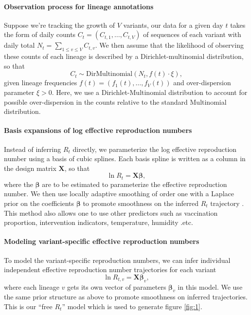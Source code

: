 \documentclass[11pt,oneside,letterpaper]{article}
\renewcommand{\vec}[1]{\boldsymbol{#1}}
\begin{document}
\paragraph{Observation process for lineage annotations}%

Suppose we're tracking the growth of $V$ variants, our data for a given day $t$ takes the form of daily counts $C_{t} = (C_{t,1}, \ldots, C_{t,V})$ of sequences of each variant with daily total $N_{t} = \sum_{1\leq v \leq V} C_{t, v}$.
We then assume that the likelihood of observing these counts of each lineage is described by a Dirichlet-multinomial distribution, so that
\begin{equation}
    C_{t} \sim \text{DirMultinomial}(N_{t}, f(t)\cdot \xi),
\end{equation}
given lineage frequencies $f(t) = (f_{1}(t), \ldots, f_{V}(t))$ and over-dispersion parameter $\xi>0$.
Here, we use a Dirichlet-Multinomial distribution to account for possible over-dispersion in the counts relative to the standard Multinomial distribution.

\paragraph{Basis expansions of log effective reproduction numbers}%

Instead of inferring $R_{t}$ directly, we parameterize the log effective reproduction number using a basis of cubic splines.
Each basis spline is written as a column in the design matrix $\vec{X}$, so that
\begin{equation}
  \ln R_{t} = \vec{X} \vec{\beta},
\end{equation}
where the $\vec{\beta}$ are to be estimated to parameterize the effective reproduction number.
We then use locally adaptive smoothing of order one with a Laplace prior on the coefficients $\vec{\beta}$ to promote smoothness on the inferred $R_t$ trajectory \cite{Faulkner2018}.
This method also allows one to use other predictors such as vaccination proportion, intervention indicators, temperature, humidity .etc.

\paragraph{Modeling variant-specific effective reproduction numbers}%

To model the variant-specific reproduction numbers, we can infer individual independent effective reproduction number trajectories for each variant
\begin{equation}
  \ln R_{t, v} = \vec{X} \vec{\beta}_{v},
\end{equation}
where each lineage $v$ gets its own vector of parameters $\vec{\beta}_{v}$ in this model.
We use the same prior structure as above to promote smoothness on inferred trajectories. This is our ``free $R_{t}$'' model which is used to generate figure \ref{fig:1}.
\end{document}
